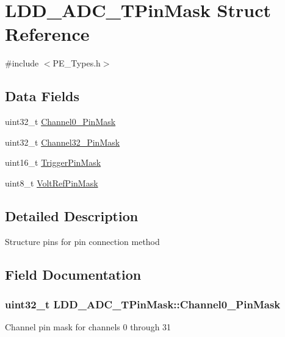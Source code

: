 \hypertarget{struct_l_d_d___a_d_c___t_pin_mask}{}\section{L\+D\+D\+\_\+\+A\+D\+C\+\_\+\+T\+Pin\+Mask Struct Reference}
\label{struct_l_d_d___a_d_c___t_pin_mask}


{\ttfamily \#include $<$P\+E\+\_\+\+Types.\+h$>$}

\subsection*{Data Fields}
\begin{DoxyCompactItemize}
\item 
uint32\+\_\+t \hyperlink{struct_l_d_d___a_d_c___t_pin_mask_a66d94f79f603c74c93540553a49bbf3f}{Channel0\+\_\+Pin\+Mask}
\item 
uint32\+\_\+t \hyperlink{struct_l_d_d___a_d_c___t_pin_mask_acd6bf6f512fb6e8cd170188dc663a4d8}{Channel32\+\_\+Pin\+Mask}
\item 
uint16\+\_\+t \hyperlink{struct_l_d_d___a_d_c___t_pin_mask_a004a4d3a4f4071684e6676f64322215f}{Trigger\+Pin\+Mask}
\item 
uint8\+\_\+t \hyperlink{struct_l_d_d___a_d_c___t_pin_mask_a556430a91304e7db634bda25091b892c}{Volt\+Ref\+Pin\+Mask}
\end{DoxyCompactItemize}


\subsection{Detailed Description}
Structure pins for pin connection method 

\subsection{Field Documentation}
\hypertarget{struct_l_d_d___a_d_c___t_pin_mask_a66d94f79f603c74c93540553a49bbf3f}{}
\subsubsection[{Channel0\+\_\+31\+Pin\+Mask}]{\setlength{\rightskip}{0pt plus 5cm}uint32\+\_\+t L\+D\+D\+\_\+\+A\+D\+C\+\_\+\+T\+Pin\+Mask\+::\+Channel0\+\_\+Pin\+Mask}\label{struct_l_d_d___a_d_c___t_pin_mask_a66d94f79f603c74c93540553a49bbf3f}
Channel pin mask for channels 0 through 31 \hypertarget{struct_l_d_d___a_d_c___t_pin_mask_acd6bf6f512fb6e8cd170188dc663a4d8}{}
